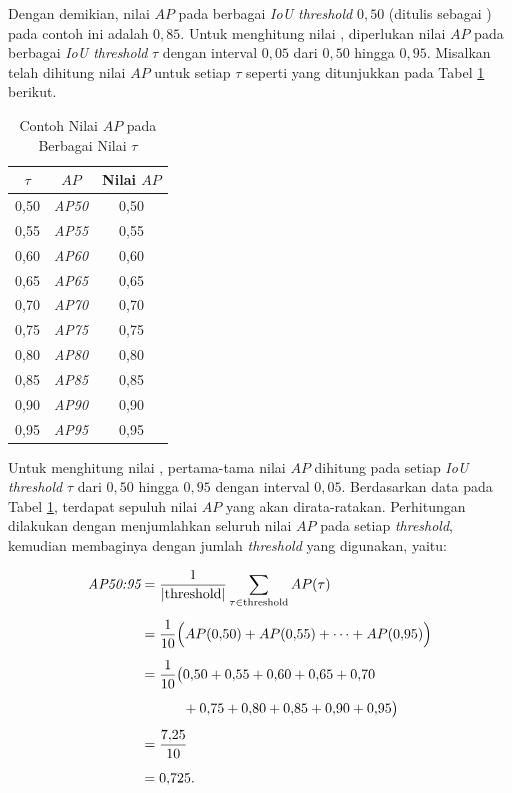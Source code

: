 Dengan demikian, nilai $AP$ pada berbagai \textit{IoU threshold} $0{,}50$ (ditulis sebagai \APfifty) pada contoh ini adalah $0{,}85$. Untuk menghitung nilai \APrangefifty, diperlukan nilai $AP$ pada berbagai \textit{IoU threshold} $\tau$ dengan interval $0{,}05$ dari $0{,}50$ hingga $0{,}95$. Misalkan telah dihitung nilai $AP$ untuk setiap $\tau$ seperti yang ditunjukkan pada Tabel \ref{table:3.contoh-ap-05-95} berikut.

\begin{table}[H]
\centering
\caption{Contoh Nilai $AP$ pada Berbagai Nilai $\tau$}
\renewcommand{\arraystretch}{1.3}
\label{table:3.contoh-ap-05-95}
\begin{tabular}{|c|c|c|}
\hline
\textbf{$\tau$} & \textbf{$AP$} & \textbf{Nilai $AP$} \\
\hline
0{,}50 & \textit{AP50} & 0{,}50 \\
\hline
0{,}55 & \textit{AP55} & 0{,}55 \\
\hline
0{,}60 & \textit{AP60} & 0{,}60 \\
\hline
0{,}65 & \textit{AP65} & 0{,}65 \\
\hline
0{,}70 & \textit{AP70} & 0{,}70 \\
\hline
0{,}75 & \textit{AP75} & 0{,}75 \\
\hline
0{,}80 & \textit{AP80} & 0{,}80 \\
\hline
0{,}85 & \textit{AP85} & 0{,}85 \\
\hline
0{,}90 & \textit{AP90} & 0{,}90 \\
\hline
0{,}95 & \textit{AP95} & 0{,}95 \\
\hline
\end{tabular}
\end{table}

Untuk menghitung nilai \APrangefifty, pertama-tama nilai $AP$ dihitung pada setiap \textit{IoU threshold} $\tau$ dari $0{,}50$ hingga $0{,}95$ dengan interval $0{,}05$. Berdasarkan data pada Tabel \ref{table:3.contoh-ap-05-95}, terdapat sepuluh nilai $AP$ yang akan dirata-ratakan. Perhitungan dilakukan dengan menjumlahkan seluruh nilai $AP$ pada setiap \textit{threshold}, kemudian membaginya dengan jumlah \textit{threshold} yang digunakan, yaitu:

\begin{align*}
    \textit{AP50:95}
    &= \frac{1}{|\text{threshold}|} 
    \sum_{\tau \in \text{threshold}} AP(\tau) \\[0.5em]
    &= \frac{1}{10} \Big( AP(0{,}50) + AP(0{,}55) + \cdots + AP(0{,}95) \Big) \\[0.5em]
    &= \frac{1}{10} \big( 0{,}50 + 0{,}55 + 0{,}60 + 0{,}65 + 0{,}70 \\[0.5em]
    &\quad\quad\quad + 0{,}75 + 0{,}80 + 0{,}85 + 0{,}90 + 0{,}95 \big) \\[0.5em]
    &= \frac{7{,}25}{10} \\[0.5em]
    &= 0{,}725. \\[0.5em]
\end{align*}

